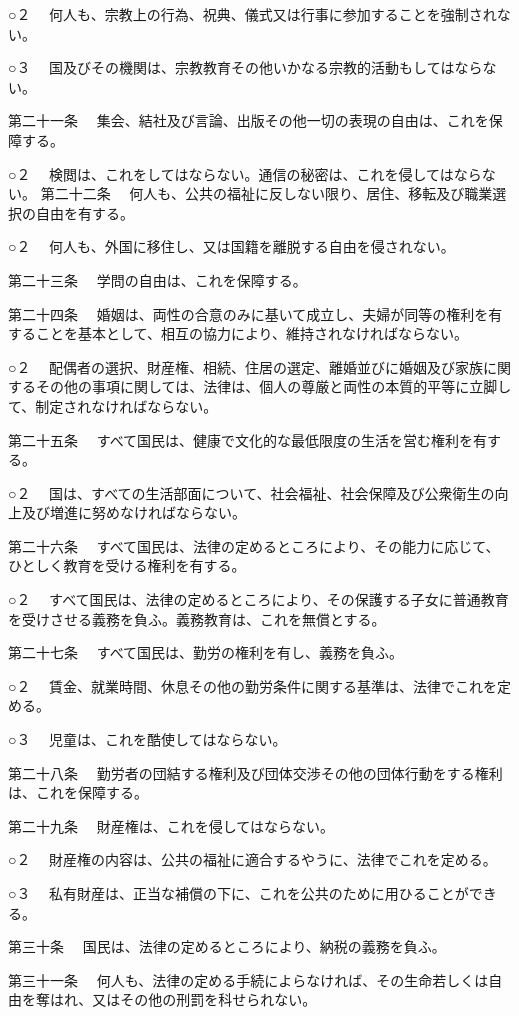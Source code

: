 ○２ 　何人も、宗教上の行為、祝典、儀式又は行事に参加することを強制されない。

○３ 　国及びその機関は、宗教教育その他いかなる宗教的活動もしてはならない。

第二十一条 　集会、結社及び言論、出版その他一切の表現の自由は、これを保障する。

○２ 　検閲は、これをしてはならない。通信の秘密は、これを侵してはならない。
第二十二条 　何人も、公共の福祉に反しない限り、居住、移転及び職業選択の自由を有する。

○２ 　何人も、外国に移住し、又は国籍を離脱する自由を侵されない。

第二十三条 　学問の自由は、これを保障する。

第二十四条 　婚姻は、両性の合意のみに基いて成立し、夫婦が同等の権利を有することを基本として、相互の協力により、維持されなければならない。

○２ 　配偶者の選択、財産権、相続、住居の選定、離婚並びに婚姻及び家族に関するその他の事項に関しては、法律は、個人の尊厳と両性の本質的平等に立脚して、制定されなければならない。

第二十五条 　すべて国民は、健康で文化的な最低限度の生活を営む権利を有する。

○２ 　国は、すべての生活部面について、社会福祉、社会保障及び公衆衛生の向上及び増進に努めなければならない。

第二十六条 　すべて国民は、法律の定めるところにより、その能力に応じて、ひとしく教育を受ける権利を有する。

○２ 　すべて国民は、法律の定めるところにより、その保護する子女に普通教育を受けさせる義務を負ふ。義務教育は、これを無償とする。

第二十七条 　すべて国民は、勤労の権利を有し、義務を負ふ。

○２ 　賃金、就業時間、休息その他の勤労条件に関する基準は、法律でこれを定める。

○３ 　児童は、これを酷使してはならない。

第二十八条 　勤労者の団結する権利及び団体交渉その他の団体行動をする権利は、これを保障する。

第二十九条 　財産権は、これを侵してはならない。

○２ 　財産権の内容は、公共の福祉に適合するやうに、法律でこれを定める。

○３ 　私有財産は、正当な補償の下に、これを公共のために用ひることができる。

第三十条 　国民は、法律の定めるところにより、納税の義務を負ふ。

第三十一条 　何人も、法律の定める手続によらなければ、その生命若しくは自由を奪はれ、又はその他の刑罰を科せられない。

